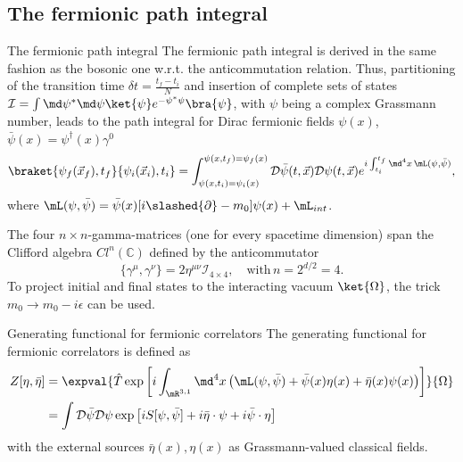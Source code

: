 \subsection{The fermionic path integral}
\begin{mybox}{The fermionic path integral}
The fermionic path integral is derived in the same fashion as the bosonic one w.r.t. the anticommutation relation. Thus, partitioning of the transition time $\delta t = \frac{t_f-t_i}{N}$ and insertion of complete sets of states $\mathcal{I} = \int \md\psi^* \md \psi \ket{\psi} e^{-\psi^* \psi } \bra{\psi}$, with $\psi$ being a complex Grassmann number, leads to the path integral for Dirac fermionic fields $\psi(x)$, $\bar{\psi}(x) = \psi^{\dagger}(x) \gamma^0$
\begin{equation}
	\braket{\psi_f(\vec{x}_f), t_f}{\psi_i(\vec{x}_i),t_i} = \int_{\psi(x,t_i)=\psi_i(x)}^{\psi(x,t_f)=\psi_f(x)} \mathcal{D}\bar{\psi}(t,\vec{x}) \mathcal{D}\psi(t,\vec{x}) e^{i \int_{t_i}^{t_f} \md^4 x \, \mL (\psi, \bar{\psi})},
\end{equation}
where $\mL(\psi,\bar{\psi})=\bar{\psi}(x) [i \slashed{\partial} - m_0] \psi(x) + \mL_{int}$.
\end{mybox}
The four $n\times n$-gamma-matrices (one for every spacetime dimension) span the Clifford algebra $Cl^n(\mathbb{C})$ defined by the anticommutator
\begin{equation}
	\{\gamma^{\mu},\gamma^{\nu} \} = 2 \eta^{\mu \nu} \mathcal{I}_{4\times 4}, \quad \mathrm{with} \, n=2^{d/2} = 4.
\end{equation}
To project initial and final states to the interacting vacuum $\ket{\Omega}$, the trick $m_0 \rightarrow m_0 - i \epsilon$ can be used.\\
\begin{mybox}{Generating functional for fermionic correlators}
	The generating functional for fermionic correlators is defined as 
	\begin{align}
		Z[\eta, \bar{\eta}] &= \expval{\hat{T} \exp\left[i \int_{\mR^{3,1}} \md^4 x \left(\mL(\psi,\bar{\psi}) + \bar{\psi}(x) \eta(x) + \bar{\eta}(x) \psi(x) \right)\right]}{\Omega} \\
		&= \int \mathcal{D}\bar{\psi} \mathcal{D}\psi \exp\left[i S[\psi, \bar{\psi}]+ i \bar{\eta} \cdot \psi + i \bar{\psi} \cdot \eta \right]
	\end{align}
with the external sources $\bar{\eta}(x), \eta(x)$ as Grassmann-valued classical fields.
\end{mybox}


